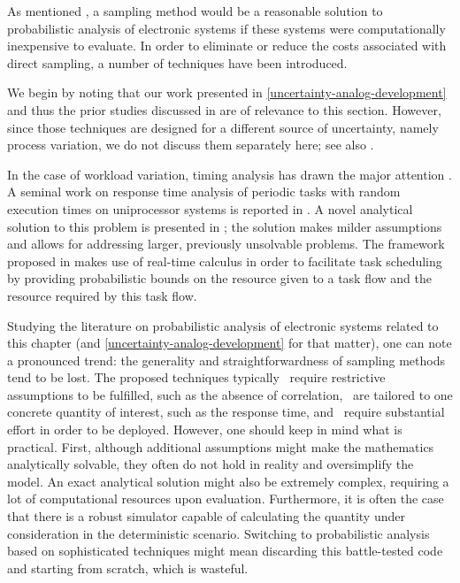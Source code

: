 As mentioned , a sampling method would be a reasonable solution to
probabilistic analysis of electronic systems if these systems were
computationally inexpensive to evaluate. In order to eliminate or reduce the
costs associated with direct sampling, a number of techniques have been
introduced.

We begin by noting that our work presented in
\cref{uncertainty-analog-development} and thus the prior studies discussed in
 are of relevance to this section. However, since those
techniques are designed for a different source of uncertainty, namely process
variation, we do not discuss them separately here; see also
.

In the case of workload variation, timing analysis has drawn the major attention
\cite{quinton2012}. A seminal work on response time analysis of periodic tasks
with random execution times on uniprocessor systems is reported in
\cite{diaz2002}. A novel analytical solution to this problem is presented in
\cite{tanasa2015}; the solution makes milder assumptions and allows for
addressing larger, previously unsolvable problems. The framework proposed in
\cite{santinelli2011} makes use of real-time calculus in order to facilitate
task scheduling by providing probabilistic bounds on the resource given to a
task flow and the resource required by this task flow.

Studying the literature on probabilistic analysis of electronic systems related
to this chapter (and \cref{uncertainty-analog-development} for that matter), one
can note a pronounced trend: the generality and straightforwardness of sampling
methods tend to be lost. The proposed techniques typically \one~require
restrictive assumptions to be fulfilled, such as the absence of correlation,
\two~are tailored to one concrete quantity of interest, such as the response
time, and \three~require substantial effort in order to be deployed. However,
one should keep in mind what is practical. First, although additional
assumptions might make the mathematics analytically solvable, they often do not
hold in reality and oversimplify the model. An exact analytical solution might
also be extremely complex, requiring a lot of computational resources upon
evaluation. Furthermore, it is often the case that there is a robust simulator
capable of calculating the quantity under consideration in the deterministic
scenario. Switching to probabilistic analysis based on sophisticated techniques
might mean discarding this battle-tested code and starting from scratch, which
is wasteful.

